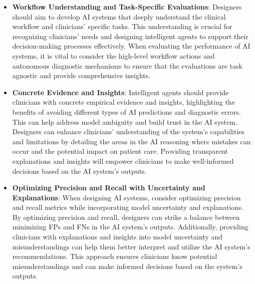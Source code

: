 \begin{itemize}

\item \textbf{Workflow Understanding and Task-Specific Evaluations}:
Designers should aim to develop \ac{AI} systems that deeply understand the clinical workflow and clinicians' specific tasks.
This understanding is crucial for recognizing clinicians' needs and designing intelligent agents to support their decision-making processes effectively.
When evaluating the performance of \ac{AI} systems, it is vital to consider the high-level workflow actions and autonomous diagnostic mechanisms to ensure that the evaluations are task agnostic and provide comprehensive insights.

\vspace{0.025mm}

\item \textbf{Concrete Evidence and Insights}:
Intelligent agents should provide clinicians with concrete empirical evidence and insights, highlighting the benefits of avoiding different types of \ac{AI} predictions and diagnostic errors.
This can help address model ambiguity and build trust in the \ac{AI} system.
Designers can enhance clinicians' understanding of the system's capabilities and limitations by detailing the areas in the \ac{AI} reasoning where mistakes can occur and the potential impact on patient care.
Providing transparent explanations and insights will empower clinicians to make well-informed decisions based on the \ac{AI} system's outputs.

\vspace{0.025mm}

\item \textbf{Optimizing Precision and Recall with Uncertainty and Explanations}:
When designing \ac{AI} systems, consider optimizing precision and recall metrics while incorporating model uncertainty and explanations.
By optimizing precision and recall, designers can strike a balance between minimizing \acp{FP} and \acp{FN} in the \ac{AI} system's outputs.
Additionally, providing clinicians with explanations and insights into model uncertainty and misunderstandings can help them better interpret and utilize the \ac{AI} system's recommendations.
This approach ensures clinicians know potential misunderstandings and can make informed decisions based on the system's outputs.

\end{itemize}

\vspace{0.05mm}

